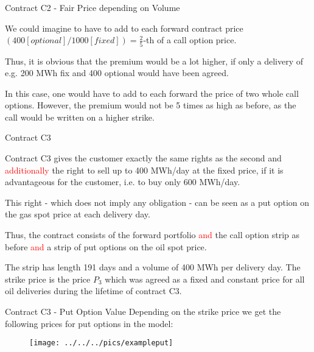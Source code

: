 


{Contract C2 - Fair Price depending on Volume}






	We could imagine to have to add to each forward contract price $(400 [optional]/1000 [fixed]) = \frac 2 5$-th of a call option price.

	Thus, it is obvious that the premium would be a lot higher, if only a delivery of e.g. 200 MWh fix and 400 optional would have been agreed.

	In this case, one would have to add to each forward the price of two whole call options. However, the premium would not be 5 times as high as before, as the call would be written on a higher strike.







{Contract C3}






	Contract C3 gives the customer exactly the same rights as the second and \textcolor{red}{additionally} the right to sell up to 400 MWh/day at the fixed price, if it is advantageous for the customer, i.e. to buy only 600 MWh/day.

	This right - which does not imply any obligation - can be seen as a put option on the gas spot price at each delivery day.

	Thus, the contract consists of the forward portfolio \textcolor{red}{and} the call option strip as before \textcolor{red}{and} a strip of put options on the oil spot price.

	The strip has length 191 days and a volume of 400 MWh per delivery day. The strike price is the price $P_3$ which was agreed as a fixed and constant price for all oil deliveries during the lifetime of contract C3.






{Contract C3  - Put Option Value}
Depending on the strike price we get the following prices for put options in the model:
\begin{figure}
	\centering
		\texttt{[image: ../../../pics/exampleput]}
	\label{fig:exampleput}
\end{figure}

